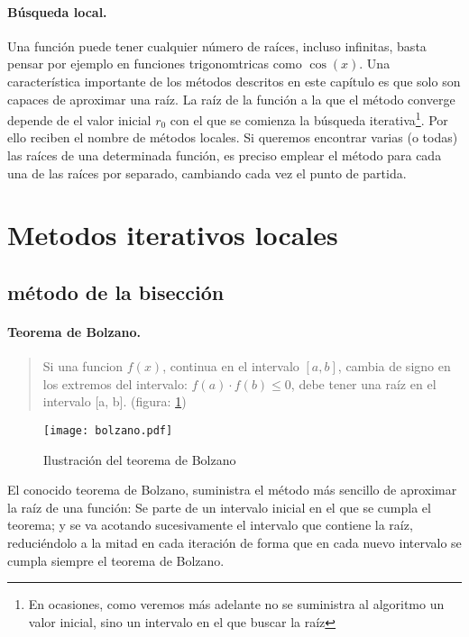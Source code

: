 \paragraph*{Búsqueda local.} Una función puede tener cualquier número de raíces, incluso infinitas, basta pensar por ejemplo en funciones trigonomtricas como $\cos(x)$. Una característica importante de los métodos descritos en este capítulo es que solo son capaces de aproximar una raíz. La raíz de la función a la que el método converge depende de el valor inicial $r_0$ con el que se comienza la búsqueda iterativa\footnote{En ocasiones, como veremos más adelante no se suministra al algoritmo un valor inicial, sino un intervalo en el que buscar la raíz}. Por ello reciben el nombre de métodos locales. Si queremos encontrar varias (o todas) las raíces de una determinada función, es preciso emplear el método para cada una de las raíces por separado, cambiando cada vez el punto de partida.

\section{Metodos iterativos locales}
\subsection{método de la bisección}
\paragraph*{Teorema de Bolzano.}
\begin{quote}
Si una funcion $f(x)$, continua en el intervalo $[a, b]$, cambia de signo en los extremos del intervalo: $f(a)\cdot f(b) \le 0$, debe tener una raíz en el intervalo [a, b]. (figura: \ref{fig:bolzano}) 
\end{quote}

\begin{figure}[h]
\centering
\texttt{[image: bolzano.pdf]}
\caption{Ilustración del teorema de Bolzano}
\label{fig:bolzano}
\end{figure}

El conocido teorema de Bolzano, suministra el método más sencillo de aproximar la raíz de una función: Se parte de un intervalo inicial en el que se cumpla el teorema; y se va acotando sucesivamente el intervalo que contiene la raíz, reduciéndolo a la mitad en cada iteración de forma que en cada nuevo intervalo se cumpla siempre el teorema de Bolzano.


